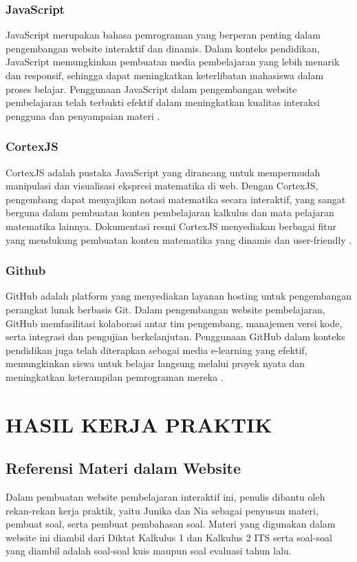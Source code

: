 \documentclass{file/KP-ITS}
\theoremstyle{definition}
\theoremstyle{definition}
\theoremstyle{plain}
\begin{document}
\subsection{JavaScript}

JavaScript merupakan bahasa pemrograman yang berperan penting dalam pengembangan website interaktif dan dinamis. Dalam konteks pendidikan, JavaScript memungkinkan pembuatan media pembelajaran yang lebih menarik dan responsif, sehingga dapat meningkatkan keterlibatan mahasiswa dalam proses belajar. Penggunaan JavaScript dalam pengembangan website pembelajaran telah terbukti efektif dalam meningkatkan kualitas interaksi pengguna dan penyampaian materi \cite{insana2021pengembangan}.

\subsection{CortexJS}

CortexJS adalah pustaka JavaScript yang dirancang untuk mempermudah manipulasi dan visualisasi ekspresi matematika di web. Dengan CortexJS, pengembang dapat menyajikan notasi matematika secara interaktif, yang sangat berguna dalam pembuatan konten pembelajaran kalkulus dan mata pelajaran matematika lainnya. Dokumentasi resmi CortexJS menyediakan berbagai fitur yang mendukung pembuatan konten matematika yang dinamis dan user-friendly \cite{cortexjs2025}.

\subsection{Github}

GitHub adalah platform yang menyediakan layanan hosting untuk pengembangan perangkat lunak berbasis Git. Dalam pengembangan website pembelajaran, GitHub memfasilitasi kolaborasi antar tim pengembang, manajemen versi kode, serta integrasi dan pengujian berkelanjutan. Penggunaan GitHub dalam konteks pendidikan juga telah diterapkan sebagai media e-learning yang efektif, memungkinkan siswa untuk belajar langsung melalui proyek nyata dan meningkatkan keterampilan pemrograman mereka \cite{rahmawati2021penerapan}.


\chapter{HASIL KERJA PRAKTIK}
\section{Referensi Materi dalam Website}
Dalam pembuatan website pembelajaran interaktif ini, penulis dibantu oleh rekan-rekan kerja praktik, yaitu Junika dan Nia sebagai penyusun materi, pembuat soal, serta pembuat pembahasan soal. Materi yang digunakan dalam website ini diambil dari Diktat Kalkulus 1 dan Kalkulus 2 ITS serta soal-soal yang diambil adalah soal-soal kuis maupun soal evaluasi tahun lalu.
\end{document}
